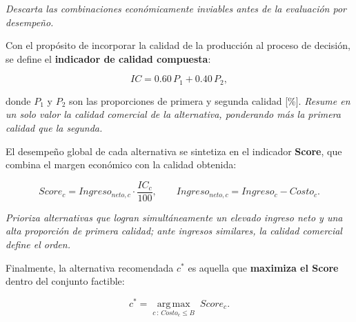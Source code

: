\documentclass[12pt]{report}
\begin{document}
\textit{Descarta las combinaciones económicamente inviables antes de la evaluación por desempeño.}

\vspace{0.2cm}

Con el propósito de incorporar la calidad de la producción al proceso de decisión, se define el \textbf{indicador de calidad compuesta}:

\vspace{0.2cm}

\begin{equation}
IC = 0.60\,P_{1} + 0.40\,P_{2},
\end{equation}

\vspace{0.2cm}

donde $P_1$ y $P_2$ son las proporciones de primera y segunda calidad [\%]. \textit{Resume en un solo valor la calidad comercial de la alternativa, ponderando más la primera calidad que la segunda.}

\vspace{0.2cm}

El desempeño global de cada alternativa se sintetiza en el indicador \textbf{Score}, que combina el margen económico con la calidad obtenida:

\vspace{0.2cm}

\begin{equation}
Score_c = Ingreso_{neto,c}\cdot \frac{IC_c}{100},
\qquad
Ingreso_{neto,c} = Ingreso_c - Costo_c.
\end{equation}

\vspace{0.2cm}

\textit{Prioriza alternativas que logran simultáneamente un elevado ingreso neto y una alta proporción de primera calidad; ante ingresos similares, la calidad comercial define el orden.}

\vspace{0.2cm}

Finalmente, la alternativa recomendada $c^{*}$ es aquella que \textbf{maximiza el Score} dentro del conjunto factible:

\vspace{0.2cm}

\begin{equation}
c^{*} = \operatorname*{arg\,max}_{c\,:\,Costo_c \le B} \; Score_c.
\end{equation}

\vspace{0.2cm}
\end{document}
